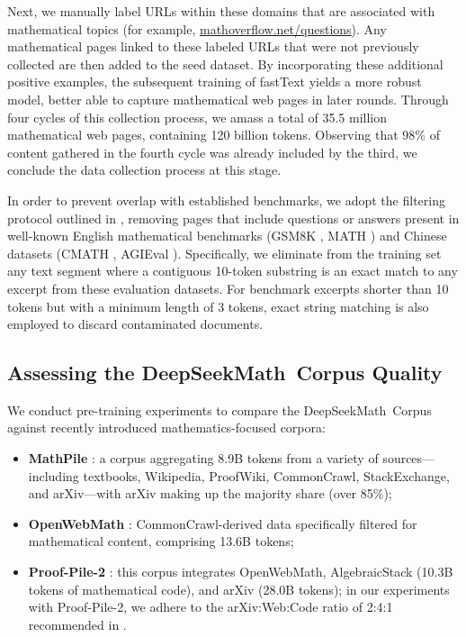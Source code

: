 Next, we manually label URLs within these domains that are associated with mathematical topics (for example, \url{mathoverflow.net/questions}). Any mathematical pages linked to these labeled URLs that were not previously collected are then added to the seed dataset. By incorporating these additional positive examples, the subsequent training of fastText yields a more robust model, better able to capture mathematical web pages in later rounds. Through four cycles of this collection process, we amass a total of 35.5 million mathematical web pages, containing 120 billion tokens. Observing that 98\% of content gathered in the fourth cycle was already included by the third, we conclude the data collection process at this stage.

In order to prevent overlap with established benchmarks, we adopt the filtering protocol outlined in \cite{deepseek-coder}, removing pages that include questions or answers present in well-known English mathematical benchmarks (GSM8K \citep{gsm8k}, MATH \citep{MATH}) and Chinese datasets (CMATH \citep{wei2023cmath}, AGIEval \citep{agieval}). Specifically, we eliminate from the training set any text segment where a contiguous 10-token substring is an exact match to any excerpt from these evaluation datasets. For benchmark excerpts shorter than 10 tokens but with a minimum length of 3 tokens, exact string matching is also employed to discard contaminated documents.

\subsection{Assessing the DeepSeekMath~Corpus Quality}

We conduct pre-training experiments to compare the DeepSeekMath~Corpus against recently introduced mathematics-focused corpora:

\begin{itemize}[topsep=0pt]
    \item \textbf{MathPile} \citep{mathpile}: a corpus aggregating 8.9B tokens from a variety of sources—including textbooks, Wikipedia, ProofWiki, CommonCrawl, StackExchange, and arXiv—with arXiv making up the majority share (over 85\%);
    \item \textbf{OpenWebMath} \citep{openwebmath}: CommonCrawl-derived data specifically filtered for mathematical content, comprising 13.6B tokens;
    \item \textbf{Proof-Pile-2} \citep{llemma}: this corpus integrates OpenWebMath, AlgebraicStack (10.3B tokens of mathematical code), and arXiv (28.0B tokens); in our experiments with Proof-Pile-2, we adhere to the arXiv:Web:Code ratio of 2:4:1 recommended in \cite{llemma}.
\end{itemize}

